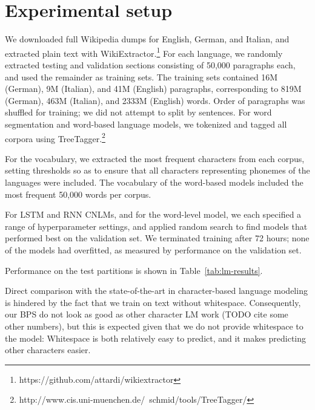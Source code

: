 \section{Experimental setup}
\label{sec:setup}

We downloaded full Wikipedia dumps for English, German, and Italian, and extracted plain text with WikiExtractor.\footnote{https://github.com/attardi/wikiextractor}
For each language, we randomly extracted testing and validation sections consisting of 50,000 paragraphs each, and used the remainder as training sets.
The training sets contained 16M (German), 9M (Italian), and 41M (English) paragraphs, corresponding to 819M (German), 463M (Italian), and 2333M (English) words.
Order of paragraphs was shuffled for training; we did not attempt to split by sentences.
For word segmentation and word-based language models, we tokenized and tagged all corpora using TreeTagger.\footnote{http://www.cis.uni-muenchen.de/~schmid/tools/TreeTagger/}

For the vocabulary, we extracted the most frequent characters from each corpus, setting thresholds so as to ensure that all characters representing phonemes of the languages were included.
The vocabulary of the word-based models included the most frequent 50,000 words per corpus.


For LSTM and RNN CNLMs, and for the word-level model, we each specified a range of hyperparameter settings, and applied random search to find models that performed best on the validation set.
We terminated training after 72 hours; none of the models had overfitted, as measured by performance on the validation set.

Performance on the test partitions is shown in Table~\ref{tab:lm-results}.

Direct comparison with the state-of-the-art in character-based language modeling is hindered by the fact that we train on text without whitespace.
Consequently, our BPS do not look as good as other character LM work (TODO cite some other numbers), but this is expected given that we do not provide whitespace to the model: Whitespace is both relatively easy to predict, and it makes predicting other characters easier.



